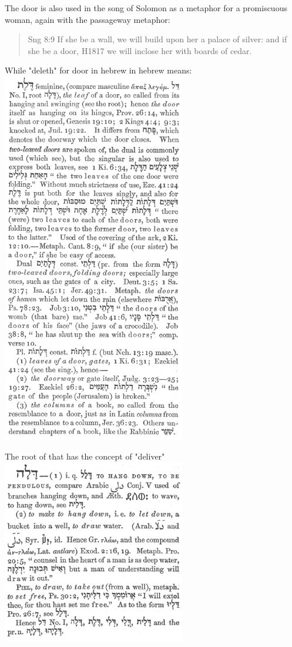 \documentclass[11pt]{article}
\begin{document}
The door is also used in the song of Solomon as a metaphor for a promiscuous woman, again with the passageway metaphor:
\begin{quote}
Sng 8:9
If she be a wall, we will build upon her a palace of silver: and if she be a door, H1817 we will inclose her with boards of cedar.
\end{quote}
While "deleth" for door in hebrew in hebrew means:  \newline
\includegraphics[width=8cm]{deleth_h1817}


The root of that has the concept of "deliver"
\includegraphics[width=8cm]{dala_h1802}
\end{document}
